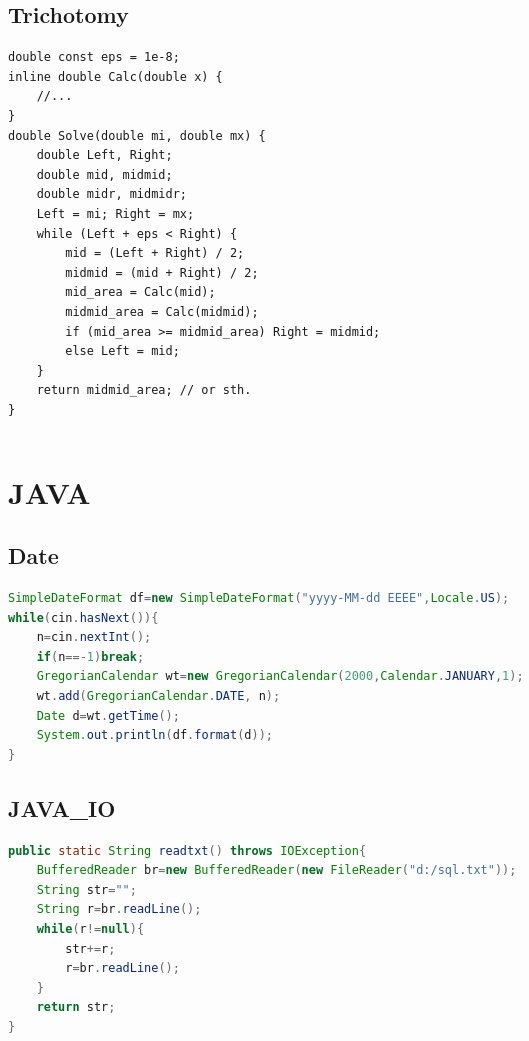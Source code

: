 \documentclass[a4paper]{article}
\begin{document}
\begin{CJK*}{UTF8}{gbsn}
\begin{multicols}{3}
\begin{flushleft}
\subsection{Trichotomy}
\begin{lstlisting}
double const eps = 1e-8;
inline double Calc(double x) {
    //...
}
double Solve(double mi, double mx) {
    double Left, Right;
    double mid, midmid;
    double midr, midmidr;
    Left = mi; Right = mx;
    while (Left + eps < Right) {
        mid = (Left + Right) / 2;
        midmid = (mid + Right) / 2;
        mid_area = Calc(mid);
        midmid_area = Calc(midmid);
        if (mid_area >= midmid_area) Right = midmid;
        else Left = mid;
    }
    return midmid_area; // or sth.
}
\end{lstlisting}

\begin{lstlisting}
\end{lstlisting}



\section{JAVA}

\subsection{Date}
\begin{lstlisting}[language={Java}]
SimpleDateFormat df=new SimpleDateFormat("yyyy-MM-dd EEEE",Locale.US);
while(cin.hasNext()){
    n=cin.nextInt();
    if(n==-1)break;
    GregorianCalendar wt=new GregorianCalendar(2000,Calendar.JANUARY,1);
    wt.add(GregorianCalendar.DATE, n);
    Date d=wt.getTime();
    System.out.println(df.format(d));
}
\end{lstlisting}

\subsection{JAVA\_IO}
\begin{lstlisting}[language={Java}]
public static String readtxt() throws IOException{
    BufferedReader br=new BufferedReader(new FileReader("d:/sql.txt"));
    String str="";
    String r=br.readLine();
    while(r!=null){
        str+=r;
        r=br.readLine();
    }
    return str;
}
\end{lstlisting}



\end{flushleft}
\end{multicols}
\end{CJK*}
\end{document}
